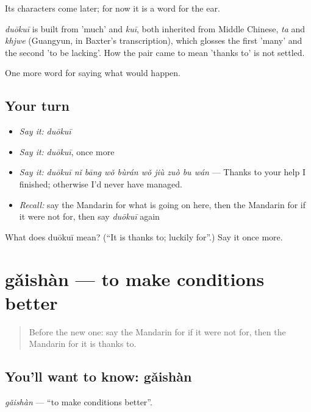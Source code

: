 Its characters come later; for now it is a word for the ear.

\begin{cousinweb}
\emph{duōkuī} is built from  'much' and \emph{kuī}, both inherited from Middle Chinese, \emph{ta} and \emph{khjwe} (Guangyun, in Baxter's transcription), which glosses the first 'many' and the second 'to be lacking'. How the pair came to mean 'thanks to' is not settled.
\end{cousinweb}

\begin{grammarlens}[title={What you've built}]
One more word for saying what would happen.
\end{grammarlens}

\subsection*{Your turn}
\begin{itemize}
\raggedright
  \item \emph{Say it:} \emph{duōkuī}
  \item \emph{Say it:} \emph{duōkuī}, once more
  \item \emph{Say it:} \emph{duōkuī nǐ bāng wǒ bùrán wǒ jiù zuò bu wán} — Thanks to your help I finished; otherwise I'd never have managed.
  \item \emph{Recall:} say the Mandarin for what is going on here, then the Mandarin for if it were not for, then say \emph{duōkuī} again
\end{itemize}

\begin{tcolorbox}[breakable,colback=teal!4,colframe=teal!35!black,title={Before you move on}]
What does duōkuī mean? (\textquotedblleft{}It is thanks to; luckily for\textquotedblright{}.) Say it once more.
\end{tcolorbox}
\section[gǎishàn]{gǎishàn — to make conditions better}

\label{lesson:ZH-C541-gaishan}



\begin{quote}
Before the new one: say the Mandarin for if it were not for, then the Mandarin for it is thanks to.
\end{quote}

\subsection*{You'll want to know: gǎishàn}
\emph{gǎishàn} — \textquotedblleft{}to make conditions better\textquotedblright{}.

